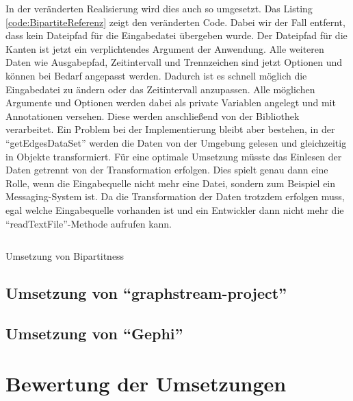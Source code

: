 In der veränderten Realisierung wird dies auch so umgesetzt. Das Listing \ref{code:BipartiteReferenz}
zeigt den veränderten Code. Dabei wir der Fall entfernt, dass kein Dateipfad
für die Eingabedatei übergeben wurde. Der Dateipfad für die Kanten ist jetzt ein
verplichtendes Argument der Anwendung. Alle weiteren Daten wie Ausgabepfad,
Zeitintervall und Trennzeichen sind jetzt Optionen und können bei Bedarf angepasst
werden. Dadurch ist es schnell möglich die Eingabedatei zu ändern oder das
Zeitintervall anzupassen. Alle möglichen Argumente und Optionen werden dabei als
private Variablen angelegt und mit Annotationen versehen. Diese werden anschließend
von der Bibliothek verarbeitet.  Ein Problem bei der Implementierung bleibt aber
bestehen, in der \enquote{getEdgesDataSet} werden die Daten von der Umgebung
gelesen und gleichzeitig in Objekte transformiert. Für eine optimale Umsetzung
müsste das Einlesen der Daten getrennt von der Transformation erfolgen.
Dies spielt genau dann eine Rolle, wenn die Eingabequelle nicht mehr eine Datei,
sondern zum Beispiel ein Messaging-System ist. Da die Transformation der
Daten trotzdem erfolgen muss, egal welche Eingabequelle vorhanden ist und ein
Entwickler dann nicht mehr die \enquote{readTextFile}-Methode aufrufen kann.

\begin{listing}
\inputminted[breaklines=true]{java}{../material/code/GellyStreamingResult.java}
\caption{Umsetzung von Bipartitness}
\label{code:BipartiteReferenz}
\end{listing}

\subsection{Umsetzung von \enquote{graphstream-project}}
\subsection{Umsetzung von \enquote{Gephi}}
\section{Bewertung der Umsetzungen}
